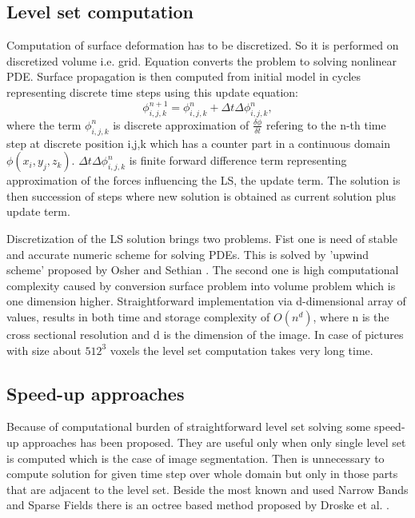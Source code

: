 \subsection{Level set computation}

Computation of surface deformation has to be discretized.
So it is performed on discretized volume i.e. grid.
Equation converts the problem to solving nonlinear PDE.
Surface propagation is then computed from initial model in cycles representing discrete time steps using this update equation:
\begin{equation}
\label{deformEqApprox}
\phi_{i,j,k}^{n+1} = \phi_{i,j,k}^{n} + \Delta t \Delta \phi_{i,j,k}^{n},
\end{equation}
where the term $\phi_{i,j,k}^{n}$ is discrete approximation of $\frac{\delta\phi}{\delta t}$ refering to the n-th time step at discrete position i,j,k which has a counter part in a continuous domain $\phi(x_i, y_j, z_k)$.
$\Delta t \Delta \phi_{i,j,k}^{n}$ is finite forward difference term representing approximation of the forces influencing the LS, the update term.
The solution is then succession of steps where new solution is obtained as current solution plus update term.

Discretization of the LS solution brings two problems.
Fist one is need of stable and accurate numeric scheme for solving PDEs.
This is solved by 'upwind scheme' proposed by Osher and Sethian \cite{sethianLS}.
The second one is high computational complexity caused by conversion surface problem into volume problem which is one dimension higher.
Straightforward implementation via d-dimensional array of values, results in both time and storage complexity of $O(n^d)$, where n is the cross sectional resolution and d is the dimension of the image.
In case of pictures with size about $512^3$ voxels the level set computation takes very long time.

\subsection{Speed-up approaches}

Because of computational burden of straightforward level set solving some speed-up approaches has been proposed.
They are useful only when only single level set is computed which is the case of image segmentation.
Then is unnecessary to compute solution for given time step over whole domain but only in those parts that are adjacent to the level set.
Beside the most known and used Narrow Bands and Sparse Fields there is an octree based method proposed by Droske et al. \cite{octree}.

